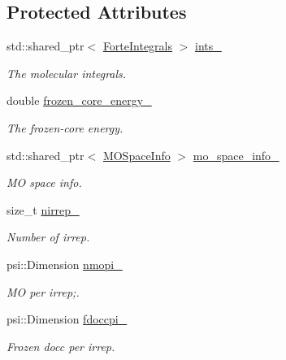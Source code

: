 \subsection*{Protected Attributes}
\begin{DoxyCompactItemize}
\item 
std\+::shared\+\_\+ptr$<$ \mbox{\hyperlink{classforte_1_1_forte_integrals}{Forte\+Integrals}} $>$ \mbox{\hyperlink{classforte_1_1_v2_r_d_m_a7b07f01d5e6f2febb5cb20677b7c7db6}{ints\+\_\+}}
\begin{DoxyCompactList}\small\item\em The molecular integrals. \end{DoxyCompactList}\item 
double \mbox{\hyperlink{classforte_1_1_v2_r_d_m_a74a0a60a88858757eeaf0fd9fff799ff}{frozen\+\_\+core\+\_\+energy\+\_\+}}
\begin{DoxyCompactList}\small\item\em The frozen-\/core energy. \end{DoxyCompactList}\item 
std\+::shared\+\_\+ptr$<$ \mbox{\hyperlink{classforte_1_1_m_o_space_info}{M\+O\+Space\+Info}} $>$ \mbox{\hyperlink{classforte_1_1_v2_r_d_m_adfb9f28ed25f6041689abd0bd14bef2e}{mo\+\_\+space\+\_\+info\+\_\+}}
\begin{DoxyCompactList}\small\item\em MO space info. \end{DoxyCompactList}\item 
size\+\_\+t \mbox{\hyperlink{classforte_1_1_v2_r_d_m_acbdb1ef23d508014a7737b3f9e660aac}{nirrep\+\_\+}}
\begin{DoxyCompactList}\small\item\em Number of irrep. \end{DoxyCompactList}\item 
psi\+::\+Dimension \mbox{\hyperlink{classforte_1_1_v2_r_d_m_ae5b9b3e7056a73a5444430eec4585293}{nmopi\+\_\+}}
\begin{DoxyCompactList}\small\item\em MO per irrep;. \end{DoxyCompactList}\item 
psi\+::\+Dimension \mbox{\hyperlink{classforte_1_1_v2_r_d_m_a6fdb93709aca855bf1cdb0255fd881d6}{fdoccpi\+\_\+}}
\begin{DoxyCompactList}\small\item\em Frozen docc per irrep. \end{DoxyCompactList}\item 

\end{DoxyCompactItemize}
